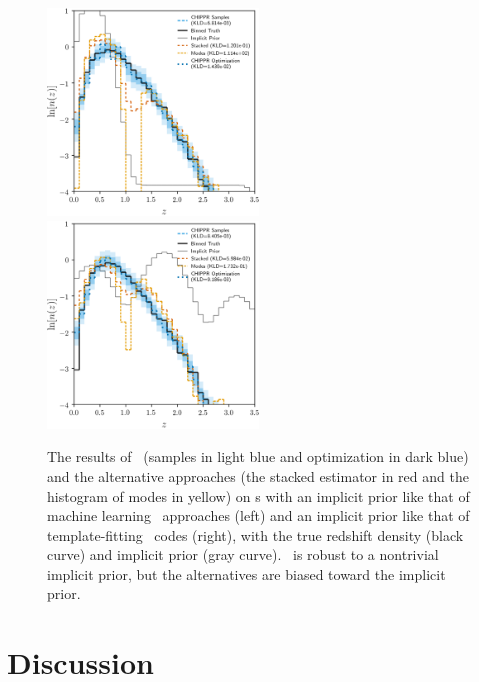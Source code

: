 \begin{figure}
	\includegraphics[width=0.5\textwidth]{figures/chippr/results_trpr.png}
	\includegraphics[width=0.5\textwidth]{figures/chippr/results_tmpr.png}
	\caption{
		The results of \Chippr\ (samples in light blue and optimization in dark blue) and the alternative approaches (the stacked estimator in red and the histogram of modes in yellow) on \pzpdf s with an implicit prior like that of machine learning \pzpdf\ approaches (left) and an implicit prior like that of template-fitting \pzpdf\ codes (right), with the true redshift density (black curve) and implicit prior (gray curve).
		\Chippr\ is robust to a nontrivial implicit prior, but the alternatives are biased toward the implicit prior.
	}
\end{figure}

\section{Discussion}



